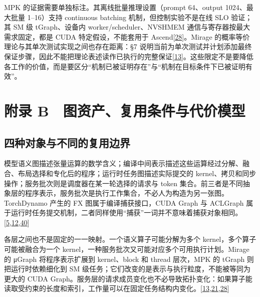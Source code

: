 \documentclass[
  UTF8,
  zihao=5]{ctexart}
\begin{document}
MPK 的证据需要单独标注。其离线批量推理设置（prompt 64、output
1024、最大批量 1--16）支持 continuous batching 机制，但控制实验不是在线
SLO 验证；其 SM 级 tGraph、设备内 worker/scheduler、NVSHMEM
通信与寄存器按最大需求固定，都是 CUDA 特定假设，不能套用于
Ascend{[}\protect\hyperlink{ref-cheng2026mpk}{28}{]}。Mirage
的概率等价理论与其单次测试实现之间也存在距离：§7
说明当前为单次测试并计划添加最终保证步骤，因此不能把理论表述读作已执行的完整保证{[}\protect\hyperlink{ref-wu2025mirage}{13}{]}。这些限定不是要降低各工作的价值，而是要区分``机制已被证明存在''与``机制在目标条件下已被证明有效''。

\hypertarget{ux9644ux5f55-b-ux56feux8d44ux4ea7ux590dux7528ux6761ux4ef6ux4e0eux4ee3ux4ef7ux6a21ux578b}{%
\section*{附录
B　图资产、复用条件与代价模型}\label{ux9644ux5f55-b-ux56feux8d44ux4ea7ux590dux7528ux6761ux4ef6ux4e0eux4ee3ux4ef7ux6a21ux578b}}

\hypertarget{ux56dbux79cdux5bf9ux8c61ux4e0eux4e0dux540cux7684ux590dux7528ux8fb9ux754c}{%
\subsection*{四种对象与不同的复用边界}\label{ux56dbux79cdux5bf9ux8c61ux4e0eux4e0dux540cux7684ux590dux7528ux8fb9ux754c}}

模型语义图描述张量运算的数学含义；编译中间表示描述这些运算经过分解、融合、布局选择和专化后的程序；运行时任务图描述实际提交的
kernel、拷贝和同步操作；服务批次则是调度器在某一轮选择的请求与 token
集合。前三者是不同抽象层的程序表示，服务批次是执行工作集合，不必人为构造为另一张图。TorchDynamo
产生的 FX 图属于编译捕获接口，CUDA Graph 与 ACLGraph
属于运行时任务提交机制，二者同样使用``捕获''一词并不意味着捕获对象相同。{[}\protect\hyperlink{ref-cann900overview}{5},\protect\hyperlink{ref-ansel2024pytorch2}{12},\protect\hyperlink{ref-nvidia2025cudaguide}{40}{]}

各层之间也不是固定的一一映射。一个语义算子可能分解为多个
kernel，多个算子可能被融合为一个
kernel，一种服务批次又可能对应多个可用执行计划。Mirage 的 μGraph
将程序表示扩展到 kernel、block 和 thread 层次，MPK 的 tGraph
则把运行时依赖细化到 SM
级任务；它们改变的是表示与执行粒度，不能被等同为更大的 CUDA
Graph。服务层的请求成员变化也不必导致拓扑变化：如果算子能读取受约束的长度和索引，工作量可以在固定任务结构内变化。{[}\protect\hyperlink{ref-wu2025mirage}{13},\protect\hyperlink{ref-ye2025flashinfer}{21},\protect\hyperlink{ref-cheng2026mpk}{28}{]}
\end{document}
